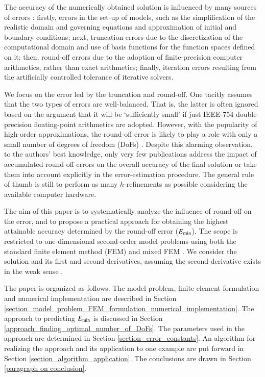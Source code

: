 \documentclass[review,3p]{elsarticle}
\begin{document}
The accuracy of the numerically obtained solution is influenced by many sources of errors \cite{ferziger2012computational}: firstly, errors in the set-up of models, such as the simplification of the realistic domain and governing equations and approximation of initial and boundary conditions; next, truncation errors due to the discretization of the computational domain and use of basis functions for the function spaces defined on it; then, round-off errors due to the adoption of finite-precision computer arithmetics, rather than exact arithmetics; finally, iteration errors resulting from the artificially controlled tolerance of iterative solvers. 

We focus on the error led by the truncation and round-off. One tacitly assumes that the two types of errors are well-balanced. That is, the latter is often ignored based on the argument that it will be `sufficiently small' if just IEEE-754 double-precision floating-point arithmetics are adopted.
However, with the popularity of high-order approximations, the round-off error is likely to play a role with only a small number of degrees of freedom (DoFs) \cite{ling1984numerical,mou2017example,alvarez2012round}. Despite this alarming observation, to the authors’ best knowledge, only very few publications address the impact of accumulated round-off errors on the overall accuracy of the final solution or take them into account explicitly in the error-estimation procedure. The general rule of thumb is still to perform as many $h$-refinements as possible considering the available computer hardware.

The aim of this paper is to systematically analyze the influence of round-off on the error, and to propose a practical approach for obtaining the highest attainable accuracy determined by the round-off error (${E}_{\rm {min}}$).
The scope is restricted to one-dimensional second-order model problems using both the standard finite element method (FEM) and mixed FEM \cite{boffi2013mixed}. We consider the solution and its first and second derivatives, assuming the second derivative exists in the weak sense \cite{necas2011direct}.

The paper is organized as follows. The model problem, finite element formulation and numerical implementation are described in Section \ref{section_model_problem_FEM_formulation_numerical_implementation}. The approach to predicting ${E}_{\rm {min}}$ is discussed in Section \ref{approach_finding_optimal_number_of_DoFs}. The parameters used in the approach are determined in Section \ref{section_error_constants}. An algorithm for realizing the approach and its application to one example are put forward in Section \ref{section_algorithm_application}. The conclusions are drawn in Section \ref{paragraph on conclusion}.
\end{document}
